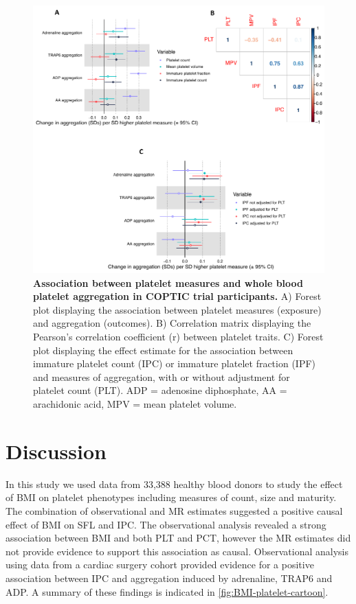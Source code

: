 \documentclass[11pt,twoside]{bristolthesis}
\begin{document}
\begin{figure}

{\centering \includegraphics[width=0.85\linewidth]{figure/BMI_platelets/IPC_aggregation} 

}

\caption[Association between platelet measures and whole blood platelet aggregation in COPTIC trial participants]{\textbf{Association between platelet measures and whole blood platelet aggregation in COPTIC trial participants.} A) Forest plot displaying the association between platelet measures (exposure) and aggregation (outcomes). B) Correlation matrix displaying the Pearson's correlation coefficient (r) between platelet traits. C) Forest plot displaying the effect estimate for the association between immature platelet count (IPC) or immature platelet fraction (IPF) and measures of aggregation, with or without adjustment for platelet count (PLT). ADP = adenosine diphosphate, AA = arachidonic acid, MPV = mean platelet volume.}\label{fig:IPC-aggregation}
\end{figure}
\hypertarget{discussion}{%
\section{Discussion}\label{discussion}}

In this study we used data from 33,388 healthy blood donors to study the effect of BMI on platelet phenotypes including measures of count, size and maturity. The combination of observational and MR estimates suggested a positive causal effect of BMI on SFL and IPC. The observational analysis revealed a strong association between BMI and both PLT and PCT, however the MR estimates did not provide evidence to support this association as causal. Observational analysis using data from a cardiac surgery cohort provided evidence for a positive association between IPC and aggregation induced by adrenaline, TRAP6 and ADP. A summary of these findings is indicated in \ref{fig:BMI-platelet-cartoon}.
\end{document}
